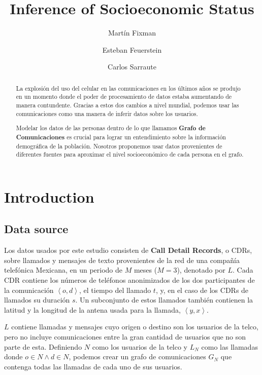 \documentclass{llncs}
\title{Inference of Socioeconomic Status}
\author{
	Martín Fixman\inst{1}
\and
	Esteban Feuerstein\inst{1}
\and
	Carlos Sarraute\inst{2}
}
\institute{
	Universidad de Buenos Aires, Argentina
\and
    Grandata Labs
}
\begin{document}
\maketitle

\begin{abstract}

La explosión del uso del celular en las comunicaciones en los últimos años se produjo en un momento donde el poder de procesamiento de datos estaba aumentando de manera contundente. Gracias a estos dos cambios a nivel mundial, podemos usar las comunicaciones como una manera de inferir datos sobre los usuarios.

Modelar los datos de las personas dentro de lo que llamamos \textbf{Grafo de Comunicaciones} es crucial para lograr un entendimiento sobre la información demográfica de la población. Nosotros proponemos usar datos provenientes de diferentes fuentes para aproximar el nivel socioeconómico de cada persona en el grafo.

\end{abstract}

\section{Introduction}


\subsection{Data source}

Los datos usados por este estudio consisten de \textbf{Call Detail Records}, o CDRs, sobre llamados y mensajes de texto provenientes de la red de una compañía telefónica Mexicana, en un periodo de \( M \) meses (\( M = 3 \)), denotado por \( L \). Cada CDR contiene los números de teléfonos anonimizados de los dos participantes de la comunicación \(\left<o, d\right>\), el tiempo del llamado \(t\), y, en el caso de los CDRs de llamados su duración \(s\). Un subconjunto de estos llamados también contienen la latitud y la longitud de la antena usada para la llamada, \(\left<y, x\right>\).

\( L \) contiene llamadas y mensajes cuyo origen o destino son los usuarios de la telco, pero no incluye comunicaciones entre la gran cantidad de usuarios que no son parte de esta. Definiendo \( N \) como los usuarios de la telco y \( L_N \) como las llamadas donde \( o \in N \wedge d \in N \), podemos crear un grafo de comunicaciones \( G_N \) que contenga todas las llamadas de cada uno de sus usuarios.
\end{document}

